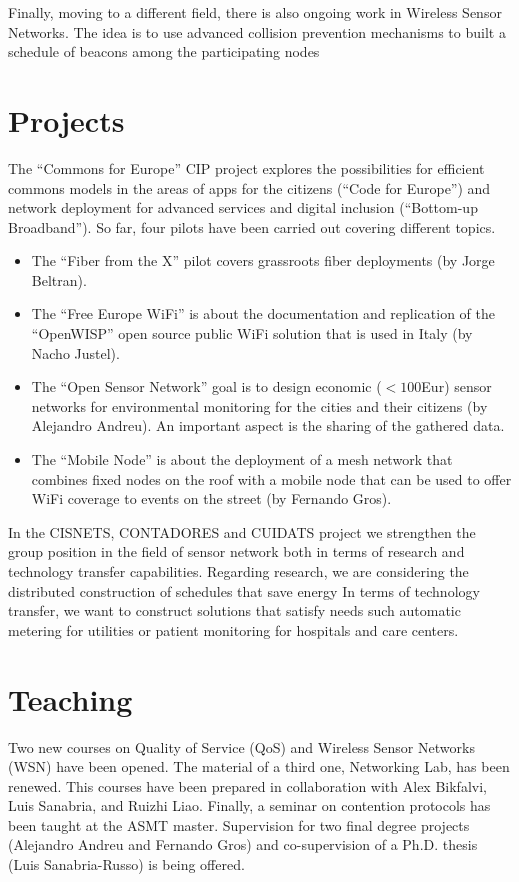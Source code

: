 \documentclass[a4paper,twocolumns]{article}%
\begin{document}
Finally, moving to a different field, there is also ongoing work in Wireless Sensor Networks.
The idea is to use advanced collision prevention mechanisms to built a schedule of beacons among the participating nodes \cite{cano2013iri}
\section{Projects}

The ``Commons for Europe'' CIP project explores the possibilities for efficient commons models in the areas of apps for the citizens (``Code for Europe'') and network deployment for advanced services and digital inclusion (``Bottom-up Broadband'').
So far, four pilots have been carried out covering different topics.
\begin{itemize}
\item The ``Fiber from the X'' pilot covers grassroots fiber deployments (by Jorge Beltran).
\item The ``Free Europe WiFi'' is about the documentation and replication of the ``OpenWISP'' open source public WiFi solution that is used in Italy (by Nacho Justel).
\item The ``Open Sensor Network'' goal is to design economic ($<100$Eur) sensor networks for environmental monitoring for the cities and their citizens (by Alejandro Andreu). 
An important aspect is the sharing of the gathered data.
\item The ``Mobile Node'' is about the deployment of a mesh network that combines fixed nodes on the roof with a mobile node that can be used to offer WiFi coverage to events on the street (by Fernando Gros).
\end{itemize}

In the CISNETS, CONTADORES and CUIDATS project we strengthen the group position in the field of sensor network both in terms of research and technology transfer capabilities.
Regarding research, we are considering the distributed construction of schedules that save energy
In terms of technology transfer, we want to construct solutions that satisfy needs such automatic metering for utilities or patient monitoring for hospitals and care centers.

\section{Teaching}

Two new courses on Quality of Service (QoS) and Wireless Sensor Networks (WSN) have been opened.
The material of a third one, Networking Lab, has been renewed.
This courses have been prepared in collaboration with Alex Bikfalvi, Luis Sanabria, and Ruizhi Liao.
Finally, a seminar on contention protocols has been taught at the ASMT master.
Supervision for two final degree projects (Alejandro Andreu and Fernando Gros)  and co-supervision of a Ph.D. thesis (Luis Sanabria-Russo) is being offered.
\end{document}
